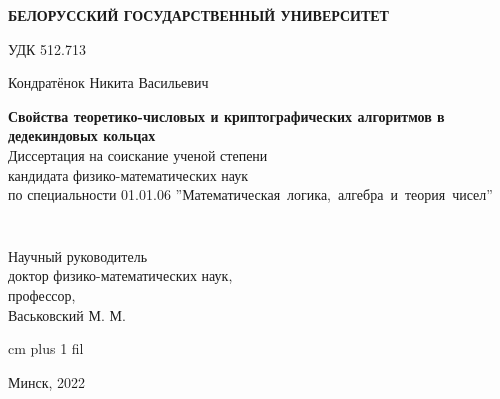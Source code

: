 \thispagestyle{empty}
\normalsize
\begin{center}
{\fontsize{16}{16}\selectfont \textbf{БЕЛОРУССКИЙ ГОСУДАРСТВЕННЫЙ УНИВЕРСИТЕТ}}
\end{center}
\vspace{4ex}
\normalsize

\noindent УДК 512.713 %

\normalsize
\begin{center}
\vspace{6ex}
{\fontsize{16}{16}\selectfont Кондратёнок Никита Васильевич}
\end{center}
\vspace{0ex}
\begin{center}
\large
\textbf{Свойства теоретико-числовых и криптографических алгоритмов в дедекиндовых кольцах}\\
\vspace{4ex}
{\fontsize{15}{15}\selectfont Диссертация на соискание ученой степени}\\
{\fontsize{15}{15}\selectfont кандидата физико-математических наук}\\
\vspace{2ex}
{\fontsize{15}{15}\selectfont по специальности 01.01.06 ''Математическая~логика,~алгебра~и~теория~чисел''}
\vspace{2ex}
\end{center}


\normalsize
\vspace{3ex}
\begin{minipage}{0.4\textwidth}
  \begin{flushleft}
$\,$\\
$\,$\\
$\,$\\
$\,$\\
\end{flushleft}
\end{minipage}
$\quad$
\begin{minipage}{0.5\textwidth}
  \begin{flushleft}
Научный руководитель\\
доктор физико-математических наук,\\
профессор,\\
Васьковский М. М.\\
  \end{flushleft}
\end{minipage}


 cm plus 1 fil
\begin{center}
Минск, 2022
\end{center}
\eject

